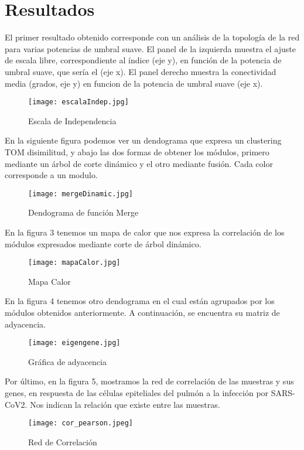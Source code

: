
\graphicspath{{/Users/laura/Desktop/BioSis/project_template_BS_SARS-CoV2/results/}}

\newpage

\section{Resultados}



\noindent El primer resultado obtenido corresponde con un análisis de la topología de la red para varias potencias de umbral suave. El panel de la izquierda muestra el ajuste de escala libre, correspondiente al índice (eje y), en función de la potencia de umbral suave, que sería el (eje x). El panel derecho muestra la conectividad media (grados, eje y) en funcion de la potencia de umbral suave (eje x).


	\begin{figure}[!htb]
		\texttt{[image: escalaIndep.jpg]}
		\caption{Escala de Independencia}
		\label{fig:cost_megabase}
	\end{figure}


\noindent En la siguiente figura podemos ver un dendograma que expresa un clustering TOM disimilitud, y abajo las dos formas de obtener los módulos, primero mediante un árbol de corte dinámico y el otro mediante fusión. Cada color corresponde a un modulo.

	\begin{figure}[!htb]
		\texttt{[image: mergeDinamic.jpg]}
		\caption{Dendograma de función Merge}
		\label{fig:cost_megabase}
	\end{figure}

\noindent En la figura 3 tenemos un mapa de calor que nos expresa la correlación de los módulos expresados mediante corte de  árbol dinámico.

	\begin{figure}[!htb]
		\texttt{[image: mapaCalor.jpg]}
		\caption{Mapa Calor}
		\label{fig:cost_megabase}
	\end{figure}


\noindent En la figura 4 tenemos otro dendograma en el cual están agrupados por los módulos obtenidos anteriormente. A continuación, se encuentra su matriz de adyacencia.

\begin{figure}[!htb]
	\texttt{[image: eigengene.jpg]}
	\caption{Gráfica de adyacencia}
	\label{fig:cost_megabase}
	\end{figure}

\newpage

\noindent Por último, en la figura 5, mostramos la red de correlación de las muestras y sus genes, en respuesta de las células epiteliales del pulmón a la infección por SARS-CoV2. Nos indican la relación que existe entre las muestras.

	\begin{figure}[!htb]
		\texttt{[image: cor\_pearson.jpeg]}
		\caption{Red de Correlación}
		\label{fig:cost_megabase}
	\end{figure}

